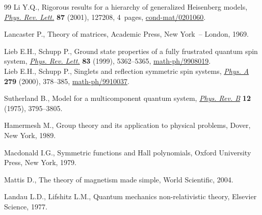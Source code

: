 \documentclass[pdftex]{sigma}
\begin{document}
\begin{thebibliography}{99}
Li Y.Q.,
Rigorous results for a hierarchy of generalized Heisenberg models,
\href{http://dx.doi.org/10.1103/PhysRevLett.87.127208}{{\it Phys. Rev. Lett.}} {\bf 87} (2001), 127208, 4~pages,
\href{http://arxiv.org/abs/cond-mat/0201060}{cond-mat/0201060}.

Lancaster P.,
Theory of matrices, Academic Press, New York~-- London, 1969.

Lieb E.H., Schupp P.,
Ground state properties of a fully frustrated quantum spin system,
\href{http://dx.doi.org/10.1103/PhysRevLett.83.5362}{{\it Phys. Rev. Lett.}} {\bf 83} (1999), 5362--5365,
\href{http://arxiv.org/abs/math-ph/9908019}{math-ph/9908019}.
\\
Lieb E.H., Schupp P.,
Singlets and ref\/lection symmetric spin systems,
\href{http://dx.doi.org/10.1016/S0378-4371(99)00521-X}{{\it Phys. A}} {\bf 279} (2000),  378--385,
\mbox{\href{http://arxiv.org/abs/math-ph/9910037}{math-ph/9910037}}.


Sutherland B.,
Model for a multicomponent quantum system,
\href{http://dx.doi.org/10.1103/PhysRevB.12.3795}{{\it Phys. Rev. B}} {\bf 12} (1975), 3795--3805.

Hamermesh M.,
Group theory and its application to physical problems,
Dover, New York, 1989.

Macdonald I.G.,
Symmetric functions and Hall polynomials, Oxford University Press, New York, 1979.


Mattis D.,
The theory of magnetism made simple, World Scientif\/ic, 2004.


Landau L.D., Lifshitz L.M.,
Quantum mechanics non-relativistic theory,  Elsevier Science, 1977.


\end{thebibliography}\LastPageEnding
\end{document}
